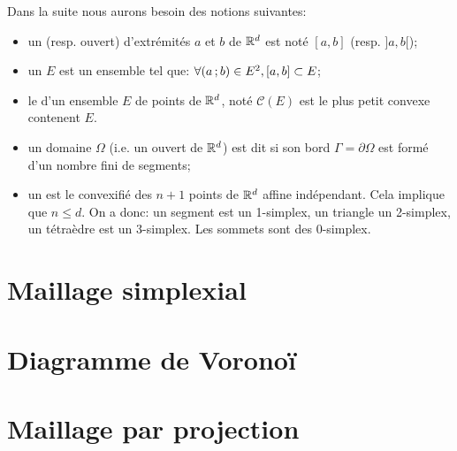 \medskip
Dans la suite nous aurons besoin des notions suivantes:
\begin{itemize}
   \item un  (resp. ouvert) d'extrémités $a$ et $b$ de $\mathbb R^d$ est noté $[a,b]$ (resp. $]a,b[$);
   \item un  $E$ est un ensemble tel que: $\forall \mathopen{(}a\,;b\mathclose{)}\in E^2, [a,b]\subset E$;
   \item le  d'un ensemble $E$ de points de $\mathbb R^d$, noté $\mathcal{C}(E)$ est le plus petit convexe
	contenent $E$.
   \item un domaine $\Omega$ (i.e. un ouvert de $\mathbb R^d$) est dit  si son bord $\Gamma=\partial\Omega$
	est formé d'un nombre fini de segments;
   \item un  est le convexifié des $n+1$ points de $\mathbb R^d$ affine indépendant.
	Cela implique que $n\le d$. On a donc: un segment est un 1-simplex, un triangle un 2-simplex, un tétraèdre est un 3-simplex.
	Les sommets sont des 0-simplex.
\end{itemize}


\medskip
\section{Maillage simplexial}




\medskip
\section{Diagramme de Voronoï}



\medskip
\section{Maillage par projection}


